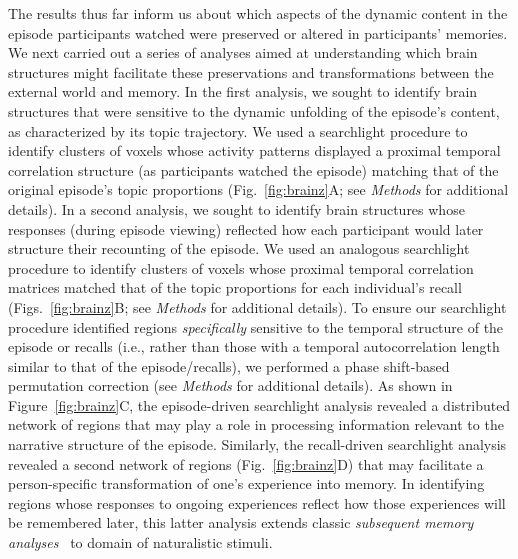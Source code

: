\documentclass{article}
\begin{document}
The results thus far inform us about which aspects of the dynamic content in the episode participants watched were preserved or altered in participants' memories.  We next carried out a series of analyses aimed at understanding which brain structures might facilitate these preservations and transformations between the external world and memory.  In the first analysis, we sought to identify brain structures that were sensitive to the dynamic unfolding of the episode's content, as characterized by its topic trajectory.  We used a searchlight procedure to identify clusters of voxels whose activity patterns displayed a proximal temporal correlation structure (as participants watched the episode) matching that of the original episode's topic proportions (Fig.~\ref{fig:brainz}A; see \textit{Methods} for additional details).  In a second analysis, we sought to identify brain structures whose responses (during episode viewing) reflected how each participant would later structure their recounting of the episode.  We used an analogous searchlight procedure to identify clusters of voxels whose proximal temporal correlation matrices matched that of the topic proportions for each individual's recall (Figs.~\ref{fig:brainz}B; see \textit{Methods} for additional details).  To ensure our searchlight procedure identified regions \textit{specifically} sensitive to the temporal structure of the episode or recalls (i.e., rather than those with a temporal autocorrelation length similar to that of the episode/recalls), we performed a phase shift-based permutation correction (see \textit{Methods} for additional details). As shown in Figure~\ref{fig:brainz}C, the episode-driven searchlight analysis revealed a distributed network of regions that may play a role in processing information relevant to the narrative structure of the episode.  Similarly, the recall-driven searchlight analysis revealed a second network of regions (Fig.~\ref{fig:brainz}D) that may facilitate a person-specific transformation of one's experience into memory.  In identifying regions whose responses to ongoing experiences reflect how those experiences will be remembered later, this latter analysis extends classic \textit{subsequent memory analyses}~\citep[e.g.,][]{PallWagn02} to domain of naturalistic stimuli.
\end{document}
